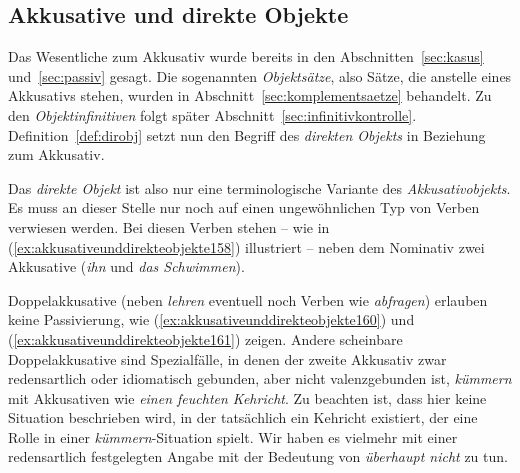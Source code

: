 \subsection{Akkusative und direkte Objekte}
\label{sec:akkusativeunddirekteobjekte}


Das Wesentliche zum Akkusativ wurde bereits in den Abschnitten~\ref{sec:kasus} und~\ref{sec:passiv} gesagt.
Die sogenannten \textit{Objektsätze}, also Sätze, die anstelle eines Akkusativs stehen, wurden in Abschnitt~\ref{sec:komplementsaetze} behandelt.
Zu den \textit{Objektinfinitiven} folgt später Abschnitt~\ref{sec:infinitivkontrolle}.
Definition~\ref{def:dirobj} setzt nun den Begriff des \textit{direkten Objekts} in Beziehung zum Akkusativ.


Das \textit{direkte Objekt} ist also nur eine terminologische Variante des \textit{Akkusativobjekts}.
Es muss an dieser Stelle nur noch auf einen ungewöhnlichen Typ von Verben verwiesen werden.
Bei diesen Verben stehen -- wie in (\ref{ex:akkusativeunddirekteobjekte158}) illustriert -- neben dem Nominativ zwei Akkusative (\textit{ihn} und \textit{das Schwimmen}).

\begin{exe}
  \ex\label{ex:akkusativeunddirekteobjekte158}
  \begin{xlist}
  \end{xlist}
\end{exe}


Doppelakkusative (neben \textit{lehren} eventuell noch Verben wie \textit{abfragen}) erlauben keine Passivierung, wie (\ref{ex:akkusativeunddirekteobjekte160}) und (\ref{ex:akkusativeunddirekteobjekte161}) zeigen.
Andere scheinbare Doppelakkusative sind Spezialfälle, in denen der zweite Akkusativ zwar redensartlich oder idiomatisch gebunden, aber nicht valenzgebunden ist, \zB \textit{kümmern} mit Akkusativen wie \textit{einen feuchten Kehricht}.
Zu beachten ist, dass hier keine Situation beschrieben wird, in der tatsächlich ein Kehricht existiert, der eine Rolle in einer \textit{kümmern}-Situation spielt.
Wir haben es vielmehr mit einer redensartlich festgelegten Angabe mit der Bedeutung von \textit{überhaupt nicht} zu tun.


